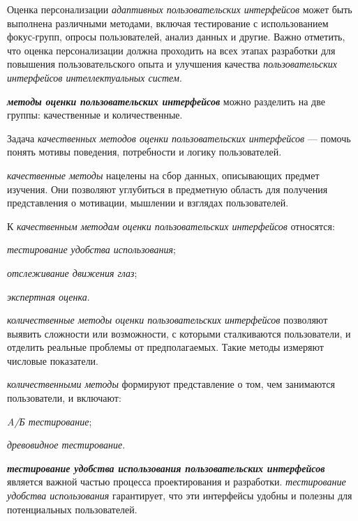 \begin{textitemize}
	Оценка персонализации \textit{адаптивных пользовательских интерфейсов} может быть выполнена различными методами, включая тестирование с использованием фокус-групп, опросы пользователей, анализ данных и другие. Важно отметить, что оценка персонализации должна проходить на всех этапах разработки для повышения пользовательского опыта и улучшения качества \textit{пользовательских интерфейсов интеллектуальных систем}.
\end{textitemize}


\textbf{\textit{методы оценки пользовательских интерфейсов}} можно разделить на две группы: качественные и количественные.
	
Задача \textit{качественных методов оценки пользовательских интерфейсов} --- помочь понять мотивы поведения, потребности и логику пользователей.
	
\textit{качественные методы} нацелены на сбор данных, описывающих предмет изучения. Они позволяют углубиться в предметную область для получения представления о мотивации, мышлении и взглядах пользователей. 
	
К \textit{качественным методам оценки пользовательских интерфейсов} относятся:
\begin{textitemize}
	\item \textit{тестирование удобства использования};
	\item \textit{отслеживание движения глаз};
	\item \textit{экспертная оценка}.
\end{textitemize}	

\textit{количественные методы оценки пользовательских интерфейсов} позволяют выявить сложности или возможности, с которыми сталкиваются пользователи, и отделить реальные проблемы от предполагаемых. Такие методы измеряют числовые показатели. 

\textit{количественными методы} формируют представление о том, чем занимаются пользователи, и включают:
\begin{textitemize}
	\item \textit{A/Б тестирование};
	\item \textit{древовидное тестирование}.
\end{textitemize}	


\textbf{\textit{тестирование удобства использования пользовательских интерфейсов}} является важной частью процесса проектирования и разработки. \textit{тестирование удобства использования} гарантирует, что эти интерфейсы удобны и полезны для потенциальных пользователей.

